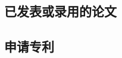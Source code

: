 % 

\begin{tableofpublications}
  \subsection*{已发表或录用的论文}
  \begin{enumerate}[{[}1{]}]
  \item {}
  \item {}
  \end{enumerate}

  \subsection*{申请专利}
  \begin{enumerate}[{[}1{]}]
  \item {}
  \end{enumerate}
\end{tableofpublications}

% 


